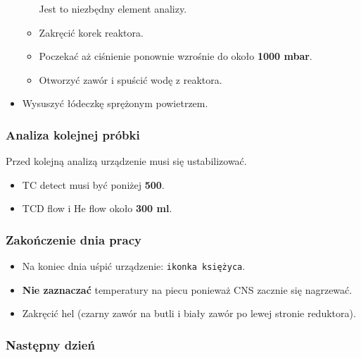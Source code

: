 \documentclass[
  letterpaper,
  DIV=11,
  numbers=noendperiod]{scrreprt}
\begin{document}
\begin{itemize}
\begin{itemize}
    Jest to niezbędny element analizy.
  \item
    Zakręcić korek reaktora.
  \item
    Poczekać aż ciśnienie ponownie wzrośnie do około \textbf{1000 mbar}.
  \item
    Otworzyć zawór i spuścić wodę z reaktora.
  \end{itemize}
\item
  Wysuszyć łódeczkę sprężonym powietrzem.
\end{itemize}

\hypertarget{analiza-kolejnej-pruxf3bki}{%
\subsubsection{Analiza kolejnej
próbki}\label{analiza-kolejnej-pruxf3bki}}

Przed kolejną analizą urządzenie musi się ustabilizować.

\begin{itemize}
\item
  TC detect musi być poniżej \textbf{500}.
\item
  TCD flow i He flow około \textbf{300 ml}.
\end{itemize}

\hypertarget{zakoux144czenie-dnia-pracy}{%
\subsubsection{Zakończenie dnia
pracy}\label{zakoux144czenie-dnia-pracy}}

\begin{itemize}
\item
  Na koniec dnia uśpić urządzenie: \texttt{ikonka\ księżyca}.
\item
  \textbf{Nie zaznaczać} temperatury na piecu ponieważ CNS zacznie się
  nagrzewać.
\item
  Zakręcić hel (czarny zawór na butli i biały zawór po lewej stronie
  reduktora).
\end{itemize}

\hypertarget{nastux119pny-dzieux144}{%
\subsubsection{Następny dzień}\label{nastux119pny-dzieux144}}
\end{document}
